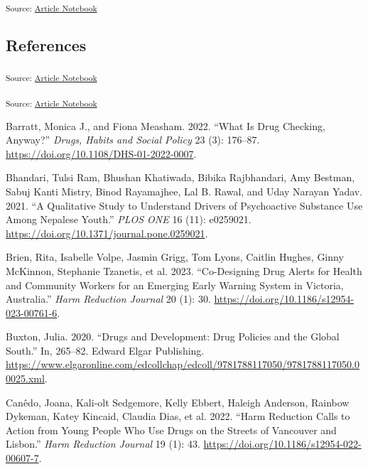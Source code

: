 \documentclass[
  letterpaper,
  DIV=11,
  numbers=noendperiod]{scrartcl}
\newlength{\cslhangindent}
\newenvironment{CSLReferences}[2] %
 {\begin{list}{}{%
  \setlength{\itemindent}{0pt}
  \setlength{\leftmargin}{0pt}
  \setlength{\parsep}{0pt}
  \ifodd #1
   \setlength{\leftmargin}{\cslhangindent}
   \setlength{\itemindent}{-1\cslhangindent}
  \fi
  \setlength{\itemsep}{#2\baselineskip}}}
 {\end{list}}
\begin{document}
\textsubscript{Source:
\href{https://mx-jx.github.io/YPWUD/index-preview.html}{Article
Notebook}}

\pagebreak

\subsection{References}\label{references}

\singlespacing

\pagebreak

\textsubscript{Source:
\href{https://mx-jx.github.io/YPWUD/index-preview.html}{Article
Notebook}}

\textsubscript{Source:
\href{https://mx-jx.github.io/YPWUD/index-preview.html}{Article
Notebook}}

\label{refs}
\begin{CSLReferences}{1}{0}
Barratt, Monica J., and Fiona Measham. 2022. {``What Is Drug Checking,
Anyway?''} \emph{Drugs, Habits and Social Policy} 23 (3): 176--87.
\url{https://doi.org/10.1108/DHS-01-2022-0007}.

Bhandari, Tulsi Ram, Bhushan Khatiwada, Bibika Rajbhandari, Amy Bestman,
Sabuj Kanti Mistry, Binod Rayamajhee, Lal B. Rawal, and Uday Narayan
Yadav. 2021. {``A Qualitative Study to Understand Drivers of
Psychoactive Substance Use Among Nepalese Youth.''} \emph{PLOS ONE} 16
(11): e0259021. \url{https://doi.org/10.1371/journal.pone.0259021}.

Brien, Rita, Isabelle Volpe, Jasmin Grigg, Tom Lyons, Caitlin Hughes,
Ginny McKinnon, Stephanie Tzanetis, et al. 2023. {``Co-Designing Drug
Alerts for Health and Community Workers for an Emerging Early Warning
System in Victoria, Australia.''} \emph{Harm Reduction Journal} 20 (1):
30. \url{https://doi.org/10.1186/s12954-023-00761-6}.

Buxton, Julia. 2020. {``Drugs and Development: Drug Policies and the
Global South.''} In, 265--82. Edward Elgar Publishing.
\url{https://www.elgaronline.com/edcollchap/edcoll/9781788117050/9781788117050.00025.xml}.

Canêdo, Joana, Kali-olt Sedgemore, Kelly Ebbert, Haleigh Anderson,
Rainbow Dykeman, Katey Kincaid, Claudia Dias, et al. 2022. {``Harm
Reduction Calls to Action from Young People Who Use Drugs on the Streets
of Vancouver and Lisbon.''} \emph{Harm Reduction Journal} 19 (1): 43.
\url{https://doi.org/10.1186/s12954-022-00607-7}.


\end{CSLReferences}
\end{document}
